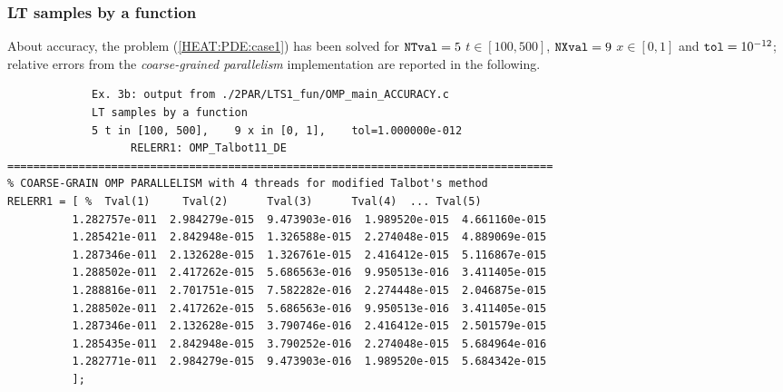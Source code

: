 \documentclass[a4paper,10pt]{report}%
\begin{document}
\subsubsection{LT samples by a function}
About accuracy, the problem (\ref{HEAT:PDE:case1}) has been solved for ${\tt NTval}=5$ $t\in[100, 500]$,
${\tt NXval}=9$ $x\in[0,1]$ and ${\tt tol}=10^{-12}$; relative errors from the {\em coarse-grained parallelism}
implementation are reported in the following.
\begin{lstlisting}
             Ex. 3b: output from ./2PAR/LTS1_fun/OMP_main_ACCURACY.c
             LT samples by a function
             5 t in [100, 500],    9 x in [0, 1],    tol=1.000000e-012
                   RELERR1: OMP_Talbot11_DE
====================================================================================
% COARSE-GRAIN OMP PARALLELISM with 4 threads for modified Talbot's method
RELERR1 = [ %  Tval(1)     Tval(2)      Tval(3)      Tval(4)  ... Tval(5)
          1.282757e-011  2.984279e-015  9.473903e-016  1.989520e-015  4.661160e-015
          1.285421e-011  2.842948e-015  1.326588e-015  2.274048e-015  4.889069e-015
          1.287346e-011  2.132628e-015  1.326761e-015  2.416412e-015  5.116867e-015
          1.288502e-011  2.417262e-015  5.686563e-016  9.950513e-016  3.411405e-015
          1.288816e-011  2.701751e-015  7.582282e-016  2.274448e-015  2.046875e-015
          1.288502e-011  2.417262e-015  5.686563e-016  9.950513e-016  3.411405e-015
          1.287346e-011  2.132628e-015  3.790746e-016  2.416412e-015  2.501579e-015
          1.285435e-011  2.842948e-015  3.790252e-016  2.274048e-015  5.684964e-016
          1.282771e-011  2.984279e-015  9.473903e-016  1.989520e-015  5.684342e-015
          ];
\end{lstlisting}
\end{document}
